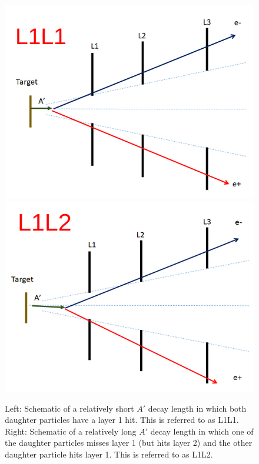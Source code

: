 \begin{figure}[t]
    \centering
    \includegraphics[width=.45\textwidth]{figs/selection/L1L1_schem.png}
    \includegraphics[width=.45\textwidth]{figs/selection/L1L2_schem.png}
    \caption{Left: Schematic of a relatively short $A'$ decay length in which both daughter particles have a layer 1 hit. This is referred to as L1L1. Right: Schematic of a relatively long $A'$ decay length in which one of the daughter particles misses layer 1 (but hits layer 2) and the other daughter particle hits layer 1. This is referred to as L1L2.}
    \label{fig:L1L2_L1L2_schem}
\end{figure}

